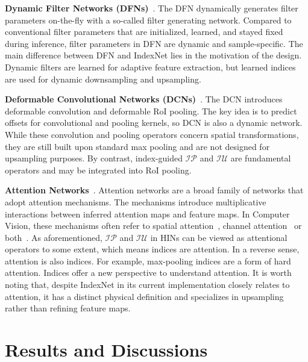 \documentclass[10pt,twocolumn,letterpaper]{article}
\begin{document}
\vspace{3pt}
\noindent\textbf{Dynamic Filter Networks (DFNs)}~\cite{jia2016dynamic}. The DFN dynamically generates filter parameters on-the-fly with a so-called filter generating network. Compared to conventional filter parameters that are initialized, learned, and stayed fixed during inference, filter parameters in DFN are dynamic and sample-specific. The main difference between DFN and IndexNet lies in the motivation of the design. Dynamic filters are learned for adaptive feature extraction, but learned indices are used for dynamic downsampling and upsampling.

\vspace{3pt}
\noindent\textbf{Deformable Convolutional Networks (DCNs)}~\cite{dai2017deformable}. The DCN introduces deformable convolution and deformable RoI pooling. The key idea is to predict offsets for convolutional and pooling kernels, so DCN is also a dynamic network. While these convolution and pooling operators concern spatial transformations, they are still built upon standard max pooling and are not designed for upsampling purposes. By contrast, index-guided $\mathcal{IP}$ and $\mathcal{IU}$ are fundamental operators and may be integrated into RoI pooling.

\vspace{3pt}
\noindent\textbf{Attention Networks}~\cite{mnih2014recurrent}. Attention networks are a broad family of networks that adopt attention mechanisms. The mechanisms introduce multiplicative interactions between inferred attention maps and feature maps. In Computer Vision, these mechanisms often refer to spatial attention~\cite{wang2017residual}, channel attention~\cite{hu2018squeeze} or both~\cite{woo2018cbam}. As aforementioned, $\mathcal{IP}$ and $\mathcal{IU}$ in HINs can be viewed as attentional operators to some extent, which means indices are attention. In a reverse sense, attention is also indices. For example, max-pooling indices are a form of hard attention. Indices offer a new perspective to understand attention. It is worth noting that, despite IndexNet in its current implementation closely relates to attention, it has a distinct physical definition and specializes in upsampling rather than refining feature maps.

\section{Results and Discussions}
\end{document}
